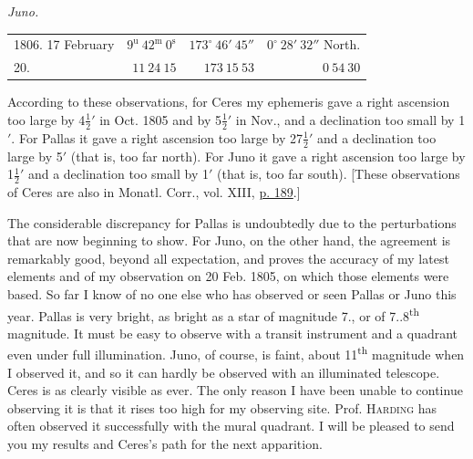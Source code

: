 \begin{center}\emph{Juno.}\end{center}
\begin{center}
\begingroup\fontsize{9}{11}\selectfont\setlength{\tabcolsep}{2pt}\renewcommand{\arraystretch}{1.1}
\begin{tabular}{lr|r|r}
1806. 17 February & $9^{\mathrm u}\ 42^{\mathrm m}\ 0^{\mathrm s}$ & $173^\circ\ 46'\ 45''$ & $0^\circ\ 28'\ 32''$ North.\\
20. & $11\ 24\ 15$ & $173\ 15\ 53$ & $0\ 54\ 30$\\
\end{tabular}\endgroup
\end{center}

\par\indent According to these observations, for Ceres my ephemeris gave a right ascension too large by 4$\frac{1}{2}'$ in Oct. 1805 and by 5$\frac{1}{2}'$ in Nov., and a declination too small by 1$'$. For Pallas it gave a right ascension too large by 27$\frac{1}{2}'$ and a declination too large by 5$'$ (that is, too far north). For Juno it gave a right ascension too large by 1$\frac{1}{2}'$ and a declination too small by 1$'$ (that is, too far south). [These observations of Ceres are also in Monatl. Corr., vol. XIII, \href{https://www.digitale-sammlungen.de/en/view/bsb10538605?page=197}{p. 189}.]



\par\indent The considerable discrepancy for Pallas is undoubtedly due to the perturbations that are now beginning to show. For Juno, on the other hand, the agreement is remarkably good, beyond all expectation, and proves the accuracy of my latest elements and of my observation on 20 Feb. 1805, on which those elements were based. So far I know of no one else who has observed or seen Pallas or Juno this year. Pallas is very bright, as bright as a star of magnitude 7., or of 7..8\textsuperscript{th} magnitude. It must be easy to observe with a transit instrument and a quadrant even under full illumination. Juno, of course, is faint, about 11\textsuperscript{th} magnitude when I observed it, and so it can hardly be observed with an illuminated telescope. Ceres is as clearly visible as ever. The only reason I have been unable to continue observing it is that it rises too high for my observing site. Prof. \textsc{Harding} has often observed it successfully with the mural quadrant. I will be pleased to send you my results and Ceres’s path for the next apparition.

